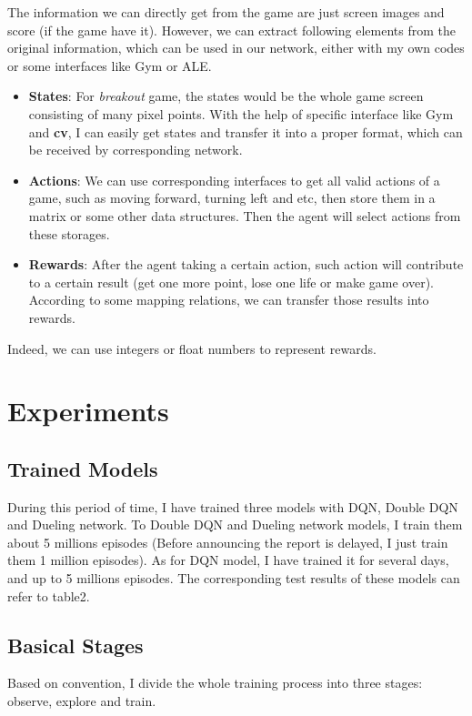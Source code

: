 \documentclass[10pt,twocolumn,letterpaper]{article}
\begin{document}
    The information we can directly get from the game are just screen images and score (if the game have it). However, we can extract following elements from the original information, which can be used in our network, either with my own codes or some interfaces like Gym or ALE.
    
	 \begin{itemize}
 		\item \textbf{States}: For \textit{breakout} game, the states would be the whole game screen consisting of many pixel points. With the help of specific interface like Gym and \textbf{cv}, I can easily get states and transfer it into a proper format, which can be received by corresponding network.
 		\item \textbf{Actions}: We can use corresponding interfaces to get all valid actions of a game, such as moving forward, turning left and etc, then store them in a matrix or some other data structures. Then the agent will select actions from these storages.
 		\item \textbf{Rewards}: After the agent taking a certain action, such action will contribute to a certain result (get one more point, lose one life or make game over). According to some mapping relations, we can transfer those results into rewards.
 	\end{itemize}
    
    Indeed, we can use integers or float numbers to represent rewards.
    
\section{Experiments}
	\subsection{Trained Models}
		
		During this period of time, I have trained three models with DQN, Double DQN and Dueling network. To Double DQN and Dueling network models, I train them about 5 millions episodes (Before announcing the report is delayed, I just train them 1 million episodes). As for DQN model, I have trained it for several days, and up to 5 millions episodes. The corresponding test results of these models can refer to table2.

	\subsection{Basical Stages}
		Based on convention, I divide the whole training process into three stages: observe, explore and train.
	
\end{document}
